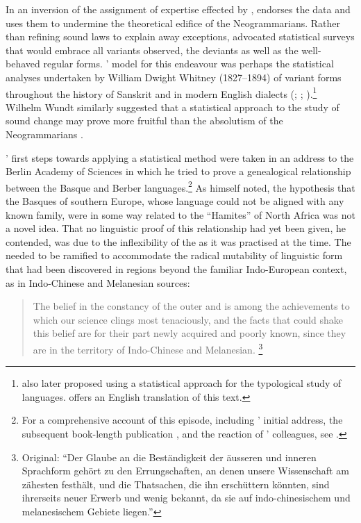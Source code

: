 \documentclass[output=paper]{langscibook}
\begin{document}
In an inversion of the assignment of expertise effected by {\Boas}, {\Gabelentz} endorses the data and uses them to undermine the theoretical edifice of the Neogrammarians. Rather than refining sound laws to explain away exceptions, \citet[198]{Gabelentz20161891} advocated statistical surveys that would embrace all variants observed, the deviants as well as the well-behaved regular forms. {\Gabelentz}' model for this endeavour was perhaps the statistical analyses undertaken by William Dwight Whitney (1827--1894) of variant forms throughout the history of Sanskrit and in modern English dialects (\citealt{Whitney1874}; \citealt{Whitney189618751878}; \citealt[cf.][vix-xx, xxii-xxiii]{Silverstein1971}).\footnote{\citet{Gabelentz1894t} also later proposed using a statistical approach for the typological study of languages. \citet{McElvenny2018typ} offers an English translation of this text.} Wilhelm Wundt similarly suggested that a statistical approach to the study of sound change may prove more fruitful than the absolutism of the Neogrammarians \citep[see][]{Formigari2018}.

{\Gabelentz}' first steps towards applying a statistical method were taken in an \citeyear{Gabelentz1893} address to the Berlin Academy of Sciences in which he tried to prove a genealogical relationship between the Basque and Berber languages.\footnote{For a comprehensive account of this episode, including {\Gabelentz}' initial address, the subsequent book-length publication \citep{Gabelentz1894bb}, and the reaction of {\Gabelentz}' colleagues, see \citet{HurchPurgay2019}.} As \citet[593--594]{Gabelentz1893} himself noted, the hypothesis that the Basques of southern Europe, whose language could not be aligned with any known family, were in some way related to the ``Hamites'' of North Africa was not a novel idea. That no linguistic proof of this relationship had yet been given, he contended, was due to the inflexibility of the  as it was practised at the time. The  needed to be ramified to accommodate the radical mutability of linguistic form that had been discovered in regions beyond the familiar Indo-European context, as in Indo-Chinese and Melanesian sources:

\begin{quotation}
The belief in the constancy of the outer and  is among the achievements to which our science clings most tenaciously, and the facts that could shake this belief are for their part newly acquired and poorly known, since they are in the territory of Indo-Chinese and Melanesian. \citep[594]{Gabelentz1893}\footnote{Original: ``Der Glaube an die Beständigkeit der äusseren und inneren Sprachform gehört zu den Errungschaften, an denen unsere Wissenschaft am zähesten festhält, und die Thatsachen, die ihn erschüttern könnten, sind ihrerseits neuer Erwerb und wenig bekannt, da sie auf indo-chinesischem und melanesischem Gebiete liegen.''}
\end{quotation}
\end{document}
